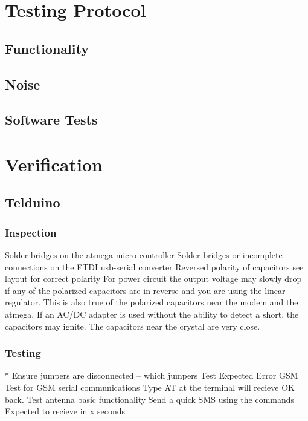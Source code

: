 \documentclass[]{article}
\begin{document}
\section{Testing Protocol}
\subsection{Functionality}
\subsection{Noise}
\subsection{Software Tests}

\section{Verification}
    \subsection{Telduino}
        \subsubsection{Inspection}
            Solder bridges on the atmega micro-controller
            Solder bridges or incomplete connections on the FTDI usb-serial converter
            Reversed polarity of capacitors see layout for correct polarity
                For power circuit the output voltage may slowly drop if any of the polarized capacitors are in reverse and you are using the linear regulator.
                This is also true of the polarized capacitors near the modem and the atmega.
                If an AC/DC adapter is used without the ability to detect a short, the capacitors may ignite.
                The capacitors near the crystal are very close.

        \subsubsection{Testing}
            * Ensure jumpers are disconnected
                -- which jumpers
            Test
            Expected
            Error
            GSM
            Test for GSM serial communications
            Type AT at the terminal will recieve OK back.
            Test antenna basic functionality
            Send a quick SMS using the commands
            Expected to recieve in x seconds
\end{document}
